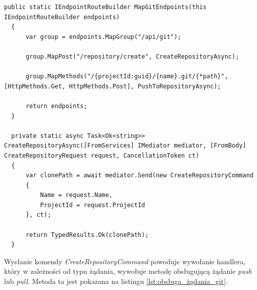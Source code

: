 \begin{lstlisting}[basicstyle=\footnotesize\ttfamily, captionpos=t, caption={Kontroler obsługujący żądania Git}, label={lst:kontroler_git}]
  public static IEndpointRouteBuilder MapGitEndpoints(this IEndpointRouteBuilder endpoints)
  {
      var group = endpoints.MapGroup("/api/git");
      
      group.MapPost("/repository/create", CreateRepositoryAsync);
      
      group.MapMethods("/{projectId:guid}/{name}.git/{*path}", [HttpMethods.Get, HttpMethods.Post], PushToRepositoryAsync);
      
      return endpoints;     
  }

  private static async Task<Ok<string>> CreateRepositoryAsync([FromServices] IMediator mediator, [FromBody] CreateRepositoryRequest request, CancellationToken ct)
  {
      var clonePath = await mediator.Send(new CreateRepositoryCommand
      {
          Name = request.Name,
          ProjectId = request.ProjectId
      }, ct);
      
      return TypedResults.Ok(clonePath);
  }
\end{lstlisting}
Wysłanie komendy \textit{CreateRepositoryCommand} powoduje wywołanie handlera, który w zależności od typu żądania, wywołuje metodę obsługującą żądanie \textit{push} lub \textit{pull}. Metoda ta jest pokazana na listingu \ref{lst:obsługa_żądania_git}.
